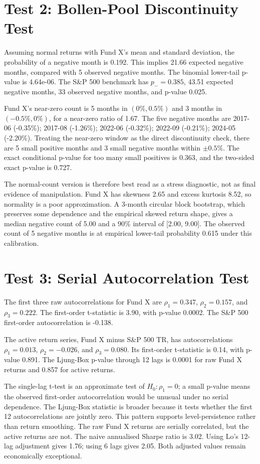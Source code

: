 \documentclass[11pt]{article}
\begin{document}
\clearpage
\section*{Test 2: Bollen-Pool Discontinuity Test}
Assuming normal returns with Fund X's mean and standard deviation, the probability of a negative month is 0.192.
This implies 21.66 expected negative months, compared with 5 observed negative months.
The binomial lower-tail p-value is 4.64e-06.
The S\&P 500 benchmark has $p_-=0.385$, 43.51 expected negative months, 33 observed negative months, and p-value 0.025.

Fund X's near-zero count is 5 months in $(0\%,0.5\%)$ and 3 months in $(-0.5\%,0\%)$, for a near-zero ratio of 1.67.
The five negative months are 2017-06 (-0.35\%); 2017-08 (-1.26\%); 2022-06 (-0.32\%); 2022-09 (-0.21\%); 2024-05 (-2.20\%).
Treating the near-zero window as the direct discontinuity check, there are 5 small positive months and 3 small negative months within $\pm 0.5\%$.
The exact conditional p-value for too many small positives is 0.363, and the two-sided exact p-value is 0.727.

The normal-count version is therefore best read as a stress diagnostic, not as final evidence of manipulation.
Fund X has skewness 2.65 and excess kurtosis 8.52, so normality is a poor approximation.
A 3-month circular block bootstrap, which preserves some dependence and the empirical skewed return shape, gives a median negative count of 5.00 and a 90\% interval of [2.00, 9.00].
The observed count of 5 negative months is at empirical lower-tail probability 0.615 under this calibration.

\section*{Test 3: Serial Autocorrelation Test}
The first three raw autocorrelations for Fund X are $\rho_1=0.347$, $\rho_2=0.157$, and $\rho_3=0.222$.
The first-order t-statistic is 3.90, with p-value 0.0002.
The S\&P 500 first-order autocorrelation is -0.138.

The active return series, Fund X minus S\&P 500 TR, has autocorrelations $\rho_1=0.013$, $\rho_2=-0.026$, and $\rho_3=0.080$.
Its first-order t-statistic is 0.14, with p-value 0.891.
The Ljung-Box p-value through 12 lags is 0.0001 for raw Fund X returns and 0.857 for active returns.

The single-lag t-test is an approximate test of $H_0:\rho_1=0$; a small p-value means the observed first-order autocorrelation would be unusual under no serial dependence.
The Ljung-Box statistic is broader because it tests whether the first 12 autocorrelations are jointly zero.
This pattern supports level-persistence rather than return smoothing. The raw Fund X returns are serially correlated, but the active returns are not.
The naive annualised Sharpe ratio is 3.02.
Using Lo's 12-lag adjustment gives 1.76; using 6 lags gives 2.05.
Both adjusted values remain economically exceptional.
\end{document}
